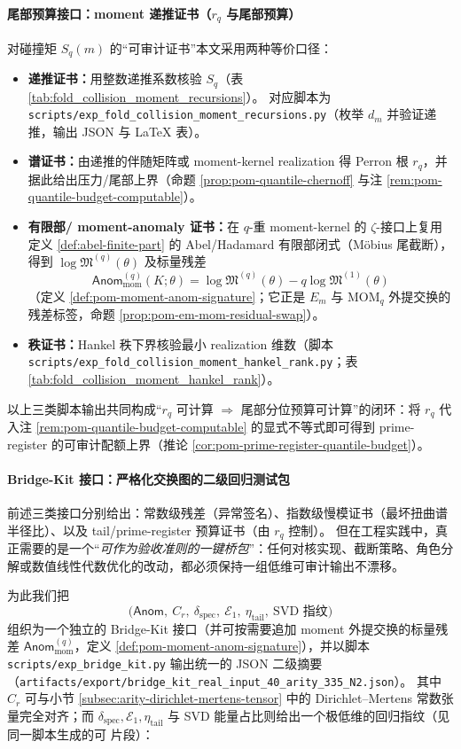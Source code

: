 \paragraph{尾部预算接口：moment 递推证书（\texorpdfstring{$r_q$}{rq} 与尾部预算）}
对碰撞矩 \(S_q(m)\) 的“可审计证书”本文采用两种等价口径：
\begin{itemize}
  \item \textbf{递推证书：}用整数递推系数核验 \(S_q\)（表 \ref{tab:fold_collision_moment_recursions}）。
  对应脚本为 \texttt{scripts/exp\_fold\_collision\_moment\_recursions.py}（枚举 \(d_m\) 并验证递推，输出 JSON 与 LaTeX 表）。
  \item \textbf{谱证书：}由递推的伴随矩阵或 moment-kernel realization 得 Perron 根 \(r_q\)，并据此给出压力/尾部上界（命题 \ref{prop:pom-quantile-chernoff} 与注 \ref{rem:pom-quantile-budget-computable}）。
  \item \textbf{有限部/ moment-anomaly 证书：}在 \(q\)-重 moment-kernel 的 \(\zeta\)-接口上复用定义 \ref{def:abel-finite-part} 的 Abel/Hadamard 有限部闭式（Möbius 尾截断），得到 \(\log\mathfrak{M}^{(q)}(\theta)\) 及标量残差
  \[
  \mathsf{Anom}^{(q)}_{\mathrm{mom}}(K;\theta)=\log\mathfrak{M}^{(q)}(\theta)-q\log\mathfrak{M}^{(1)}(\theta)
  \]
  （定义 \ref{def:pom-moment-anom-signature}；它正是 \(E_m\) 与 \(\mathrm{MOM}_q\) 外提交换的残差标签，命题 \ref{prop:pom-em-mom-residual-swap}）。
  \item \textbf{秩证书：}Hankel 秩下界核验最小 realization 维数（脚本 \texttt{scripts/exp\_fold\_collision\_moment\_hankel\_rank.py}；表 \ref{tab:fold_collision_moment_hankel_rank}）。
  \end{itemize}

以上三类脚本输出共同构成“\(r_q\) 可计算 \(\Rightarrow\) 尾部分位预算可计算”的闭环：将 \(r_q\) 代入注 \ref{rem:pom-quantile-budget-computable} 的显式不等式即可得到 prime-register 的可审计配额上界（推论 \ref{cor:pom-prime-register-quantile-budget}）。

\paragraph{Bridge-Kit 接口：严格化交换图的二级回归测试包}
前述三类接口分别给出：常数级残差（异常签名）、指数级慢模证书（最坏扭曲谱半径比）、以及 tail/prime-register 预算证书（由 \(r_q\) 控制）。
但在工程实践中，真正需要的是一个“\emph{可作为验收准则的一键桥包}”：任何对核实现、截断策略、角色分解或数值线性代数优化的改动，都必须保持一组低维可审计输出不漂移。
\par
为此我们把
\[
\bigl(\mathsf{Anom},\ C_r,\ \delta_{\mathrm{spec}},\ \mathcal{E}_1,\ \eta_{\mathrm{tail}},\ \text{SVD 指纹}\bigr)
\]
组织为一个独立的 Bridge-Kit 接口（并可按需要追加 moment 外提交换的标量残差 \(\mathsf{Anom}^{(q)}_{\mathrm{mom}}\)，定义 \ref{def:pom-moment-anom-signature}），并以脚本
\texttt{scripts/exp\_bridge\_kit.py}
输出统一的 JSON 二级摘要（\texttt{artifacts/export/bridge\_kit\_real\_input\_40\_arity\_335\_N2.json}）。
其中 \(C_r\) 可与小节 \ref{subsec:arity-dirichlet-mertens-tensor} 中的 Dirichlet--Mertens 常数张量完全对齐；而 \(\delta_{\mathrm{spec}},\mathcal{E}_1,\eta_{\mathrm{tail}}\) 与 SVD 能量占比则给出一个极低维的回归指纹（见同一脚本生成的可 \verb|| 片段）：


